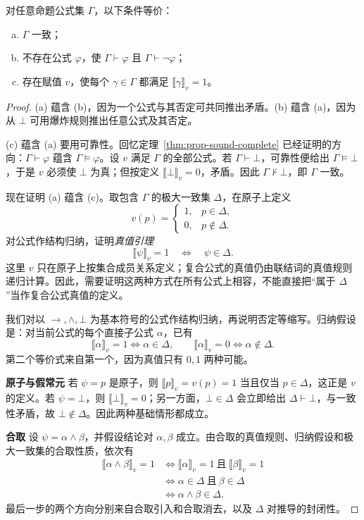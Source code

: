 \documentclass[lang=cn,a4paper,fontset=none,zihao=false,10pt,openany,twoside]{beautybook}
\numberwithin{algorithm}{chapter}
\newcommand{\val}[1]{\llbracket #1\rrbracket_v}
\begin{document}
\Needspace{55mm}
\begin{proposition}[一致集有模型]\label{prop:prop-consistent-model}
对任意命题公式集 $\Gamma$，以下条件等价：
\begin{enumerate}[(a)]
\item $\Gamma$ 一致；
\item 不存在公式 $\varphi$，使 $\Gamma\vdash\varphi$ 且 $\Gamma\vdash\neg\varphi$；
\item 存在赋值 $v$，使每个 $\gamma\in\Gamma$ 都满足 $\val\gamma=1$。
\end{enumerate}
\end{proposition}
\begin{proof}
(a) 蕴含 (b)，因为一个公式与其否定可共同推出矛盾。(b) 蕴含 (a)，因为从 $\bot$ 可用爆炸规则推出任意公式及其否定。

(c) 蕴含 (a) 要用可靠性。回忆定理~\ref{thm:prop-sound-complete} 已经证明的方向：$\Gamma\vdash\varphi$ 蕴含 $\Gamma\models\varphi$。设 $v$ 满足 $\Gamma$ 的全部公式。若 $\Gamma\vdash\bot$，可靠性便给出 $\Gamma\models\bot$，于是 $v$ 必须使 $\bot$ 为真；但按定义 $\val\bot=0$，矛盾。因此 $\Gamma\nvdash\bot$，即 $\Gamma$ 一致。

现在证明 (a) 蕴含 (c)。取包含 $\Gamma$ 的极大一致集 $\Delta$，在原子上定义
\[
 v(p)=\begin{cases}1,&p\in\Delta,\\0,&p\notin\Delta.\end{cases}
\]
对公式作结构归纳，证明\emph{真值引理}
\[
 \val\psi=1\quad\Longleftrightarrow\quad\psi\in\Delta.
\]
这里 $v$ 只在原子上按集合成员关系定义；复合公式的真值仍由联结词的真值规则递归计算。因此，需要证明这两种方式在所有公式上相容，不能直接把“属于 $\Delta$”当作复合公式真值的定义。

我们对以 $\to,\wedge,\bot$ 为基本符号的公式作结构归纳，再说明否定等缩写。归纳假设是：对当前公式的每个直接子公式 $\alpha$，已有
\[
 \val\alpha=1\Longleftrightarrow\alpha\in\Delta,
 \qquad
 \val\alpha=0\Longleftrightarrow\alpha\notin\Delta.
\]
第二个等价式来自第一个，因为真值只有 $0,1$ 两种可能。

\par\smallskip\noindent\textbf{原子与假常元}\quad
若 $\psi=p$ 是原子，则 $\val p=v(p)=1$ 当且仅当 $p\in\Delta$，这正是 $v$ 的定义。若 $\psi=\bot$，则 $\val\bot=0$；另一方面，$\bot\in\Delta$ 会立即给出 $\Delta\vdash\bot$，与一致性矛盾，故 $\bot\notin\Delta$。因此两种基础情形都成立。

\par\smallskip\noindent\textbf{合取}\quad
设 $\psi=\alpha\wedge\beta$，并假设结论对 $\alpha,\beta$ 成立。由合取的真值规则、归纳假设和极大一致集的合取性质，依次有
\begin{align*}
 \val{\alpha\wedge\beta}=1
 &\Longleftrightarrow \val\alpha=1\ \text{且}\ \val\beta=1\\
 &\Longleftrightarrow \alpha\in\Delta\ \text{且}\ \beta\in\Delta\\
 &\Longleftrightarrow \alpha\wedge\beta\in\Delta.
\end{align*}
最后一步的两个方向分别来自合取引入和合取消去，以及 $\Delta$ 对推导的封闭性。


\end{proof}
\end{document}
